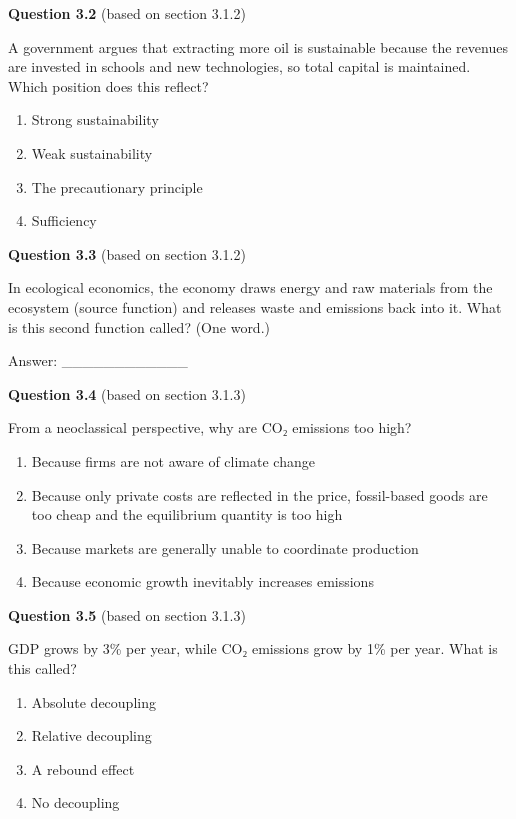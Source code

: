 \documentclass[
  british,
  a4paper,
  DIV=11,
  numbers=noendperiod,
  oneside,
  openany]{scrreprt}
\providecommand{\tightlist}{%
  \setlength{\itemsep}{0pt}\setlength{\parskip}{0pt}}
\begin{document}
\textbf{Question 3.2} (based on section 3.1.2)

A government argues that extracting more oil is sustainable because the
revenues are invested in schools and new technologies, so total capital
is maintained. Which position does this reflect?

\begin{enumerate}
\def\labelenumi{\alph{enumi})}
\tightlist
\item
  Strong sustainability
\item
  Weak sustainability
\item
  The precautionary principle
\item
  Sufficiency
\end{enumerate}

\textbf{Question 3.3} (based on section 3.1.2)

In ecological economics, the economy draws energy and raw materials from
the ecosystem (source function) and releases waste and emissions back
into it. What is this second function called? (One word.)

Answer: \_\_\_\_\_\_\_\_\_\_\_\_

\textbf{Question 3.4} (based on section 3.1.3)

From a neoclassical perspective, why are CO₂ emissions too high?

\begin{enumerate}
\def\labelenumi{\alph{enumi})}
\tightlist
\item
  Because firms are not aware of climate change
\item
  Because only private costs are reflected in the price, fossil-based
  goods are too cheap and the equilibrium quantity is too high
\item
  Because markets are generally unable to coordinate production
\item
  Because economic growth inevitably increases emissions
\end{enumerate}

\textbf{Question 3.5} (based on section 3.1.3)

GDP grows by 3\% per year, while CO₂ emissions grow by 1\% per year.
What is this called?

\begin{enumerate}
\def\labelenumi{\alph{enumi})}
\tightlist
\item
  Absolute decoupling
\item
  Relative decoupling
\item
  A rebound effect
\item
  No decoupling
\end{enumerate}
\end{document}
